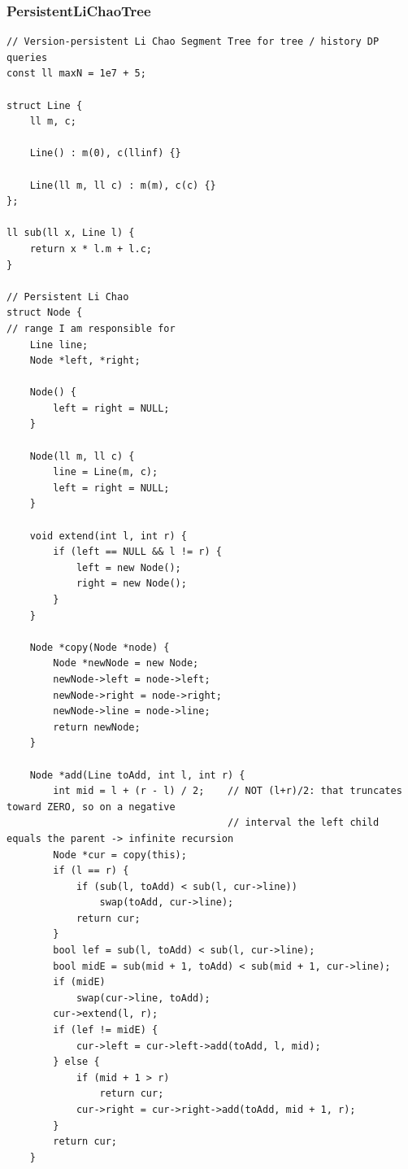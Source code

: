 \documentclass[9pt,a4paper,twocolumn]{extarticle}
\begin{document}
\subsubsection{PersistentLiChaoTree}
\nopagebreak
\begin{lstlisting}
// Version-persistent Li Chao Segment Tree for tree / history DP queries
const ll maxN = 1e7 + 5;

struct Line {
    ll m, c;

    Line() : m(0), c(llinf) {}

    Line(ll m, ll c) : m(m), c(c) {}
};

ll sub(ll x, Line l) {
    return x * l.m + l.c;
}

// Persistent Li Chao
struct Node {
// range I am responsible for
    Line line;
    Node *left, *right;

    Node() {
        left = right = NULL;
    }

    Node(ll m, ll c) {
        line = Line(m, c);
        left = right = NULL;
    }

    void extend(int l, int r) {
        if (left == NULL && l != r) {
            left = new Node();
            right = new Node();
        }
    }

    Node *copy(Node *node) {
        Node *newNode = new Node;
        newNode->left = node->left;
        newNode->right = node->right;
        newNode->line = node->line;
        return newNode;
    }

    Node *add(Line toAdd, int l, int r) {
        int mid = l + (r - l) / 2;    // NOT (l+r)/2: that truncates toward ZERO, so on a negative
                                      // interval the left child equals the parent -> infinite recursion
        Node *cur = copy(this);
        if (l == r) {
            if (sub(l, toAdd) < sub(l, cur->line))
                swap(toAdd, cur->line);
            return cur;
        }
        bool lef = sub(l, toAdd) < sub(l, cur->line);
        bool midE = sub(mid + 1, toAdd) < sub(mid + 1, cur->line);
        if (midE)
            swap(cur->line, toAdd);
        cur->extend(l, r);
        if (lef != midE) {
            cur->left = cur->left->add(toAdd, l, mid);
        } else {
            if (mid + 1 > r)
                return cur;
            cur->right = cur->right->add(toAdd, mid + 1, r);
        }
        return cur;
    }


\end{lstlisting}
\end{document}
